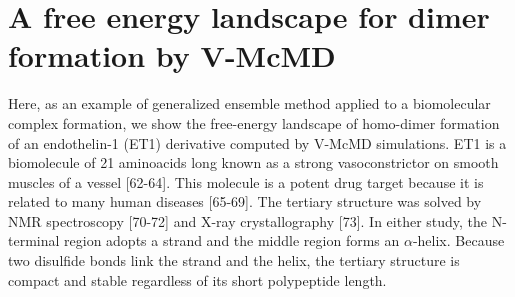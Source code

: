 \section{A free energy landscape for dimer formation by V-McMD \label{et1_sec}}
Here, as an example of generalized ensemble method applied to a biomolecular complex formation, we show the free-energy landscape of homo-dimer formation of an endothelin-1 (ET1) derivative computed by V-McMD simulations. ET1 is a biomolecule of 21 aminoacids long known as a strong vasoconstrictor on smooth muscles of a vessel [62-64]. This molecule is a potent drug target because it is related to many human diseases [65-69]. The tertiary structure was solved by NMR spectroscopy [70-72] and X-ray crystallography [73]. In either study, the N-terminal region adopts a strand and the middle region forms an $\alpha$-helix. Because two disulfide bonds link the strand and the helix, the tertiary structure is compact and stable regardless of its short polypeptide length. 

